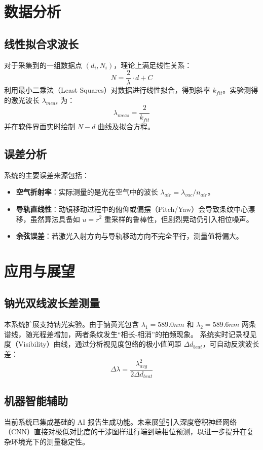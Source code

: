 \documentclass[twocolumn, a4paper, 10pt]{article}
\begin{document}
\section{数据分析}
\subsection{线性拟合求波长}
对于采集到的一组数据点 $(d_i, N_i)$，理论上满足线性关系：
\begin{equation}
    N = \frac{2}{\lambda} \cdot d + C
\end{equation}
利用最小二乘法（Least Squares）对数据进行线性拟合，得到斜率 $k_{fit}$。实验测得的激光波长 $\lambda_{meas}$ 为：
\begin{equation}
    \lambda_{meas} = \frac{2}{k_{fit}}
\end{equation}
并在软件界面实时绘制 $N-d$ 曲线及拟合方程。

\subsection{误差分析}
系统的主要误差来源包括：
\begin{itemize}
    \item \textbf{空气折射率}：实际测量的是光在空气中的波长 $\lambda_{air} = \lambda_{vac} / n_{air}$。
    \item \textbf{导轨直线性}：动镜移动过程中的俯仰或偏摆（Pitch/Yaw）会导致条纹中心漂移，虽然算法具备如 $u=r^2$ 重采样的鲁棒性，但剧烈晃动仍引入相位噪声。
    \item \textbf{余弦误差}：若激光入射方向与导轨移动方向不完全平行，测量值将偏大。
\end{itemize}

\section{应用与展望}
\subsection{钠光双线波长差测量}
本系统扩展支持钠光实验。由于钠黄光包含 $\lambda_1 = 589.0 nm$ 和 $\lambda_2 = 589.6 nm$ 两条谱线，随光程差增加，两者条纹发生“相长-相消”的拍频现象。
系统实时记录视见度（Visibility）曲线，通过分析视见度包络的极小值间距 $\Delta d_{beat}$，可自动反演波长差：
\begin{equation}
    \Delta \lambda = \frac{\lambda_{avg}^2}{2 \Delta d_{beat}}
\end{equation}

\subsection{机器智能辅助}
当前系统已集成基础的 AI 报告生成功能。未来展望引入深度卷积神经网络（CNN）直接对极低对比度的干涉图样进行端到端相位预测，以进一步提升在复杂环境光下的测量稳定性。
\end{document}
